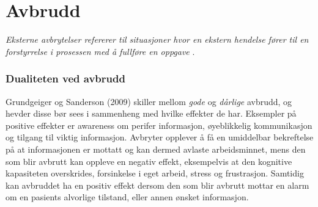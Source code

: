 \section{Avbrudd}
\label{chp: avbrudd} 
\emph{Eksterne avbrytelser refererer til situasjoner hvor en ekstern hendelse fører til en forstyrrelse i prosessen med å fullføre en oppgave} \cite{Harr07}.

\subsubsection{Dualiteten ved avbrudd}
Grundgeiger og Sanderson (2009) skiller mellom \emph{gode} og \emph{dårlige} avbrudd, og hevder disse bør sees i sammenheng med hvilke effekter de har. Eksempler på positive effekter er awareness om perifer informasjon, øyeblikkelig kommunikasjon og tilgang til viktig informasjon. Avbryter opplever å få en umiddelbar bekreftelse på at informasjonen er mottatt og kan dermed avlaste arbeidsminnet, mens den som blir avbrutt kan oppleve en negativ effekt, eksempelvis at den kognitive kapasiteten overskrides, forsinkelse i eget arbeid, stress og frustrasjon. Samtidig kan avbruddet ha en positiv effekt dersom den som blir avbrutt mottar en alarm om en pasients alvorlige tilstand, eller annen ønsket informasjon.

